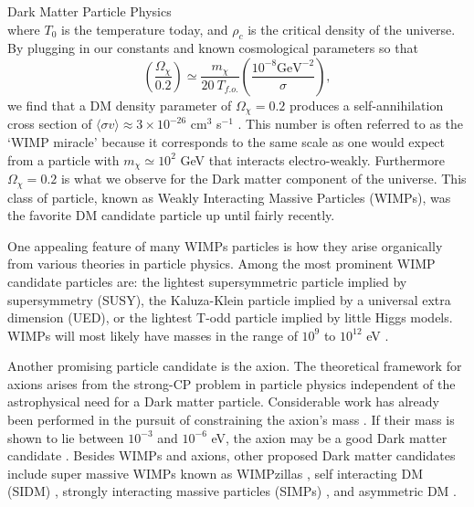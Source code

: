 \documentclass[a4paper,11pt]{article}
\begin{document}
\begin{section}{Dark Matter Particle Physics}
\begin{equation}
    \end{equation}
    where $T_0$ is the temperature today, and $\rho_c$ is the critical density of the universe.
    By plugging in our constants and known cosmological parameters so that
    \begin{equation}
        \left(\frac{\Omega_{\chi}}{0.2}\right) \simeq \frac{m_\chi }{20~ T_{f.o.}}\left(\frac{10^{-8} \mathrm{GeV}^{-2}}{\sigma}\right),
    \end{equation}
    we find that a DM density parameter of $\Omega_\chi = 0.2$ produces a self-annihilation cross section of $\langle\sigma v\rangle \approx 3\times 10^{-26}$ cm$^3$ s$^{-1}$ \cite{Profumo}.
    This number is often referred to as the `WIMP miracle' because it corresponds to the same scale as one would expect from a particle with $m_\chi \simeq 10^2$ GeV that interacts electro-weakly.
    Furthermore $\Omega_\chi = 0.2$ is what we observe for the Dark matter component of the universe. 
    This class of particle, known as Weakly Interacting Massive Particles (WIMPs), was the favorite DM candidate particle up until fairly recently.

    One appealing feature of many WIMPs particles is how they arise organically from various theories in particle physics.
    Among the most prominent WIMP candidate particles are: the lightest supersymmetric particle implied by supersymmetry (SUSY), the Kaluza-Klein particle implied by a universal extra dimension (UED), or the lightest T-odd particle implied by little Higgs models.
    WIMPs will most likely have masses in the range of $10^9$ to $10^{12}$ eV \cite{Freese:2017dm}.

    Another promising particle candidate is the axion.
    The theoretical framework for axions arises from the strong-CP problem in particle physics independent of the astrophysical need for a Dark matter particle.
    Considerable work has already been performed in the pursuit of constraining the axion's mass \cite{Freese:2017dm}. If their mass is shown to lie between $10^{-3}$ and $10^{-6}$ eV, the axion may be a good Dark matter candidate \cite{Wilczek:1978}\cite{Weinberg:1978}. 
    Besides WIMPs and axions, other proposed Dark matter candidates include super massive WIMPs known as WIMPzillas \cite{Kolb:1999}, self interacting DM (SIDM) \cite{Carlson:1992}, strongly interacting massive particles (SIMPs) \cite{Hochberg:2014} \cite{Smirnov:2020}, and asymmetric DM \cite{Freese:2017dm}.


\end{section}
\end{document}
